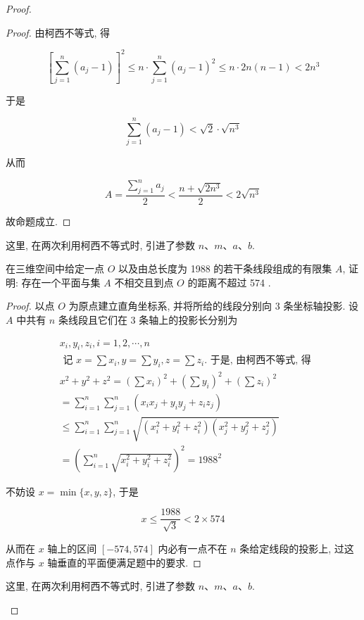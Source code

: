 \begin{proof}
\begin{example}
\begin{solution}
\begin{note}
\begin{proof}
	由柯西不等式, 得
	
	$$
	\left[\sum_{j=1}^{n}\left(a_{j}-1\right)\right]^{2} \leqslant n \cdot \sum_{j=1}^{n}\left(a_{j}-1\right)^{2} \leqslant n \cdot 2 n(n-1)<2 n^{3}
	$$
	
	于是
	
	$$
	\sum_{j=1}^{n}\left(a_{j}-1\right)<\sqrt{2} \cdot \sqrt{n^{3}}
	$$
	
	从而
	
	$$
	A=\frac{\sum_{j=1}^{n} a_{j}}{2}<\frac{n+\sqrt{2 n^{3}}}{2}<2 \sqrt{n^{3}}
	$$
	
	故命题成立.
\end{proof}
\begin{note}
	这里, 在两次利用柯西不等式时, 引进了参数 $n 、 m 、 a 、 b$.
\end{note}

\begin{example}
	在三维空间中给定一点 $O$ 以及由总长度为 1988 的若干条线段组成的有限集 $A$, 证明: 存在一个平面与集 $A$ 不相交且到点 $O$ 的距离不超过 574 .
\end{example}
\begin{proof}
	以点 $O$ 为原点建立直角坐标系, 并将所给的线段分别向 3 条坐标轴投影. 设 $A$ 中共有 $n$ 条线段且它们在 3 条轴上的投影长分别为
	
	$$
	\begin{aligned}
	& x_{i}, y_{i}, z_{i}, i=1,2, \cdots, n \\
	& \text { 记 } x=\sum x_{i}, y=\sum y_{i}, z=\sum z_{i} . \text { 于是, 由柯西不等式, 得 } \\
	& x^{2}+y^{2}+z^{2}=\left(\sum x_{i}\right)^{2}+\left(\sum y_{i}\right)^{2}+\left(\sum z_{i}\right)^{2} \\
	& =\sum_{i=1}^{n} \sum_{j=1}^{n}\left(x_{i} x_{j}+y_{i} y_{j}+z_{i} z_{j}\right) \\
	& \leqslant \sum_{i=1}^{n} \sum_{j=1}^{n} \sqrt{\left(x_{i}^{2}+y_{i}^{2}+z_{i}^{2}\right)\left(x_{j}^{2}+y_{j}^{2}+z_{j}^{2}\right)} \\
	& =\left(\sum_{i=1}^{n} \sqrt{x_{i}^{2}+y_{i}^{2}+z_{i}^{2}}\right)^{2}=1988^{2}
	\end{aligned}
	$$
	
	不妨设 $x=\min \{x, y, z\}$, 于是
	
	$$
	x \leqslant \frac{1988}{\sqrt{3}}<2 \times 574
	$$
	
	从而在 $x$ 轴上的区间 $[-574,574]$ 内必有一点不在 $n$ 条给定线段的投影上, 过这点作与 $x$ 轴垂直的平面便满足题中的要求.
\end{proof}
\begin{note}
	这里, 在两次利用柯西不等式时, 引进了参数 $n 、 m 、 a 、 b$.
\end{note}


\end{note}
\end{solution}
\end{example}
\end{proof}
